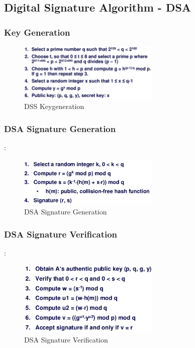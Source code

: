 \hypertarget{digital-signature-algorithm---dsa}{%
\subsection{Digital Signature Algorithm -
DSA}\label{digital-signature-algorithm---dsa}}

\subsubsection{Key Generation}
\begin{figure}[H]
\centering
\includegraphics[width=0.6\textwidth]{figures/DSS-Keygeneration.png}
\caption{DSS Keygeneration}
\end{figure}


\subsubsection{DSA Signature Generation}:\\
\begin{figure}[H]
\centering
\includegraphics[width=0.6\textwidth]{figures/DSA_signature.png}
\caption{DSA Signature Generation}
\end{figure}

\subsubsection{DSA Signature Verification}:\\
\begin{figure}[H]
\centering
\includegraphics[width=0.6\textwidth]{figures/DSA_verification.png}
\caption{DSA Signature Verification}
\end{figure}

